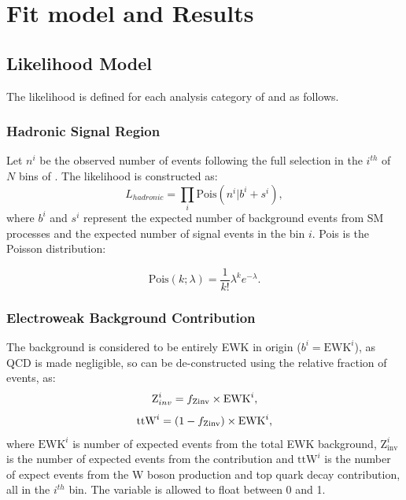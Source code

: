 \chapter{Fit model and Results}
\label{ch:results}

\ifpdf
    \graphicspath{{Chapter7/Figs/Raster/}{Chapter7/Figs/PDF/}{Chapter7/Figs/}}
\else
    \graphicspath{{Chapter7/Figs/Vector/}{Chapter7/Figs/}}
\fi


\section{Likelihood Model}  %
\label{sec:results_likelihood}
The likelihood is defined for each analysis category of \nb and \nj as follows.

\subsection{Hadronic Signal Region}

Let $n^i$ be the observed number of events 
following the full selection in the $i^{th}$ of $N$ bins of \HT. The likelihood
is constructed as:
% 
\begin{equation}
L_{hadronic} = \prod_i \text{Pois}(n^i | b^i + s^i),
\end{equation}
% 
where $b^i$ and $s^i$ represent the expected number of background events from SM 
processes and the expected number of signal events in the bin $i$. Pois is 
the Poisson distribution:

\begin{equation}
\text{Pois}(k;\lambda) = \frac{1}{k!}\lambda^k e^{-\lambda}.
\end{equation}


\subsection{Electroweak Background Contribution}
The background is considered to be entirely EWK in origin ($b^i = \text{EWK}^i$), as QCD
is made negligible, so can be de-constructed using the relative fraction
of \zinv events, \fzinv as:
% 
\begin{equation}
\text{Z}_{inv}^i = f_{\text{Zinv}} \times \text{EWK}^i,
\label{eq:ewk_frac_z}
\end{equation}
\begin{equation}
\text{ttW}^i = (1-f_{\text{Zinv}}) \times \text{EWK}^i,
\label{eq:ewk_frac_ttw}
\end{equation}
% 
where $\text{EWK}^i$ is number of expected events from the total EWK background,
$\text{Z}_{\text{inv}}^i$ is the number of expected events from the \zinv 
contribution and $\text{ttW}^i$ is the number of expect events from the W boson 
production and top quark decay contribution, all in the $i^{th}$ bin. The variable 
\fzinv is allowed to float between 0 and 1.

